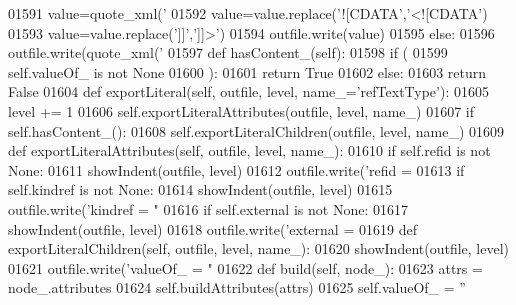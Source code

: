 \begin{DoxyCode}
{{{{{{{{{{{{{{{{{{{{{{{{{{{{{{{{{{{{{{{{{{{{{{{{{{{{{{{{{{{{{{{{{{{{{{{{{{{{{{{{{{{{{{{{{{{{{{{{{{{{{{01591             value=quote_xml(\textcolor{stringliteral}{'%
01592             value=value.replace(\textcolor{stringliteral}{'![CDATA'},\textcolor{stringliteral}{'<![CDATA'})
01593             value=value.replace(\textcolor{stringliteral}{']]'},\textcolor{stringliteral}{']]>'})
01594             outfile.write(value)
01595         \textcolor{keywordflow}{else}:
01596             outfile.write(quote_xml(\textcolor{stringliteral}{'%
01597     \textcolor{keyword}{def }hasContent_(self):
01598         \textcolor{keywordflow}{if} (
01599             self.valueOf_ \textcolor{keywordflow}{is} \textcolor{keywordflow}{not} \textcolor{keywordtype}{None}
01600             ):
01601             \textcolor{keywordflow}{return} \textcolor{keyword}{True}
01602         \textcolor{keywordflow}{else}:
01603             \textcolor{keywordflow}{return} \textcolor{keyword}{False}
01604     \textcolor{keyword}{def }exportLiteral(self, outfile, level, name\_='refTextType'):
01605         level += 1
01606         self.exportLiteralAttributes(outfile, level, name\_)
01607         \textcolor{keywordflow}{if} self.hasContent_():
01608             self.exportLiteralChildren(outfile, level, name\_)
01609     \textcolor{keyword}{def }exportLiteralAttributes(self, outfile, level, name\_):
01610         \textcolor{keywordflow}{if} self.refid \textcolor{keywordflow}{is} \textcolor{keywordflow}{not} \textcolor{keywordtype}{None}:
01611             showIndent(outfile, level)
01612             outfile.write(\textcolor{stringliteral}{'refid = %
01613         \textcolor{keywordflow}{if} self.kindref \textcolor{keywordflow}{is} \textcolor{keywordflow}{not} \textcolor{keywordtype}{None}:
01614             showIndent(outfile, level)
01615             outfile.write(\textcolor{stringliteral}{'kindref = "%
01616         \textcolor{keywordflow}{if} self.external \textcolor{keywordflow}{is} \textcolor{keywordflow}{not} \textcolor{keywordtype}{None}:
01617             showIndent(outfile, level)
01618             outfile.write(\textcolor{stringliteral}{'external = %
01619     \textcolor{keyword}{def }exportLiteralChildren(self, outfile, level, name\_):
01620         showIndent(outfile, level)
01621         outfile.write(\textcolor{stringliteral}{'valueOf\_ = "%
01622     \textcolor{keyword}{def }build(self, node\_):
01623         attrs = node\_.attributes
01624         self.buildAttributes(attrs)
01625         self.valueOf_ = \textcolor{stringliteral}{''}
}}}}}}}}}}}}}}}}}}}}}}}}}}}}}}}}}}}}}}}}}}}}}}}}}}}}}}}}}}}}}}}}}}}}}}}}}}}}}}}}}}}}}}}}}}}}}}}}}}}}}}}}}}}}
\end{DoxyCode}
